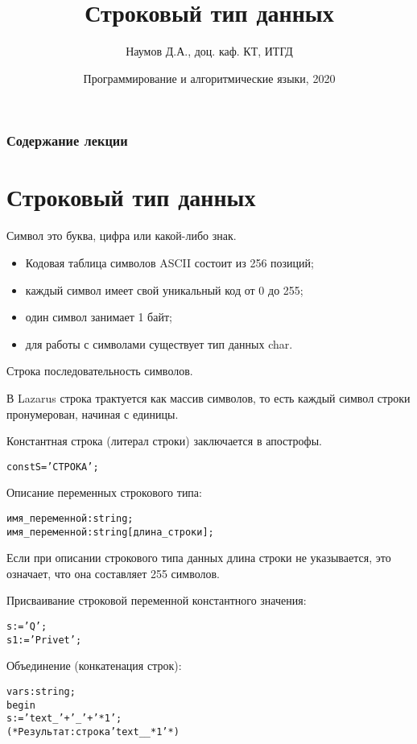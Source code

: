 \documentclass{beamer}
\title[Строки]{Строковый тип данных}
\author{Наумов Д.А., доц. каф. КТ, ИТГД }
\date[28.02.2020] {Программирование и алгоритмические языки, 2020}
\begin{document}
\begin{frame}
  \titlepage
\end{frame}
  
\begin{frame}
  \frametitle{Содержание лекции}
  \tableofcontents  
\end{frame}
  
\section{Строковый тип данных}

\begin{frame}[fragile]
\begin{block}{Символ}
это буква, цифра или какой-либо знак. 
\end{block}
\begin{itemize}
\item Кодовая таблица символов ASCII состоит из 256 позиций; 
\item каждый символ имеет свой уникальный код от 0 до 255; 
\item один символ занимает 1 байт;
\item для работы с символами существует тип данных char.
\end{itemize}
\end{frame} 

\begin{frame}[fragile]
\begin{block}{Строка}
последовательность символов. 
\end{block}
В Lazarus строка трактуется как массив символов, то есть каждый символ строки пронумерован, начиная с единицы.

Константная строка (литерал строки) заключается в апострофы. 
\begin{alltt}
const S = 'СТРОКА';
\end{alltt}

Описание переменных строкового типа: 
\begin{alltt}
имя_переменной : string;
имя_переменной : string[длина_строки];
\end{alltt}
Если при описании строкового типа данных длина строки не указывается, это означает, что она составляет 255 символов. 
\end{frame}

\begin{frame}[fragile]
Присваивание строковой переменной константного значения: 
\begin{alltt}
s := 'Q';
s1 := 'Privet';
\end{alltt}
Объединение (конкатенация строк): 
\begin{alltt}
var s : string;
begin
s:= 'text_' + '_' + '*1' ;
(* Результат: строка 'text__*1' *)
\end{alltt}
\end{frame}  
\end{document}
